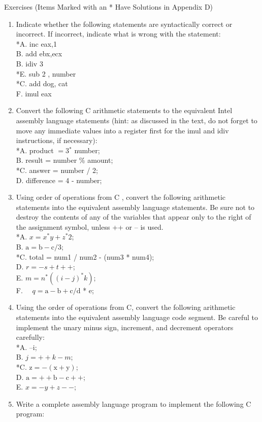 \documentclass[10pt]{book}
\begin{document}
Exercises (Items Marked with an * Have Solutions in Appendix D)
\begin{enumerate}
  \item Indicate whether the following statements are syntactically correct or incorrect. If incorrect, indicate what is wrong with the statement:\\
*A. inc eax,1\\
B. add ebx,ecx\\
B. idiv 3\\
*E. sub 2 , number\\
*C. add dog, cat\\
F. imul eax
  \item Convert the following C arithmetic statements to the equivalent Intel assembly language statements (hint: as discussed in the text, do not forget to move any immediate values into a register first for the imul and idiv instructions, if necessary):\\
*A. product $=3{ }^{*}$ number;\\
B. result = number \% amount;\\
*C. answer = number / 2;\\
D. difference = 4 - number;
  \item Using order of operations from C , convert the following arithmetic statements into the equivalent assembly language statements. Be sure not to destroy the contents of any of the variables that appear only to the right of the assignment symbol, unless ++ or -- is used.\\
*A. $x=x{ }^{*} y+z{ }^{*} 2$;\\
B. $\mathrm{a}=\mathrm{b}-\mathrm{c} / 3$;\\
*C. total = num1 / num2 - (num3 * num4);\\

D. $r=-s+t++$;\\
E. $m=n^{*}\left((i-j)^{*} k\right)$;\\
F. $\quad q=\mathrm{a}-\mathrm{b}+\mathrm{c} / \mathrm{d}$ * e;
  \item Using the order of operations from C, convert the following arithmetic statements into the equivalent assembly language code segment. Be careful to implement the unary minus sign, increment, and decrement operators carefully:\\
*A. --i;\\
B. $j=++k-m$;\\
*C. $\mathrm{z}=-(\mathrm{x}+\mathrm{y})$;\\
D. $\mathrm{a}=++\mathrm{b}-\mathrm{c}++$;\\
E. $x=-y+z--$;
  \item Write a complete assembly language program to implement the following C program:
\end{enumerate}
\end{document}
